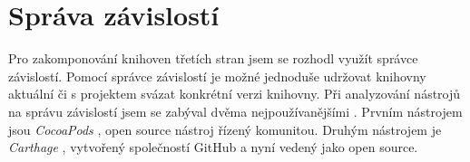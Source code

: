 \section{Správa závislostí}\label{analyza-sprava-zavislosti}

Pro zakomponování knihoven třetích stran jsem se rozhodl využít správce závislostí.
Pomocí správce závislostí je možné jednoduše udržovat knihovny aktuální či s projektem svázat konkrétní verzi knihovny.
Při analyzování nástrojů na správu závislostí jsem se zabýval dvěma nejpoužívanějšími \cite{shashikantjagtap-swift-dependency-management}.
Prvním nástrojem jsou \textit{CocoaPods} \cite{cocoapods-about}, open source nástroj řízený komunitou.
Druhým nástrojem je \textit{Carthage} \cite{github-carthage}, vytvořený společností GitHub a nyní vedený jako open source.
